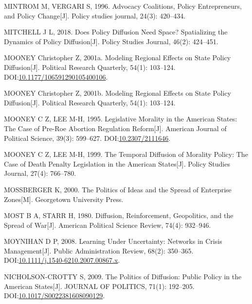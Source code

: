\documentclass[
  12pt,
]{ctexart}
\newlength{\cslhangindent}
\newlength{\cslentryspacingunit} %
\newenvironment{CSLReferences}[2] %
 {%
  \setlength{\parindent}{0pt}
  \ifodd #1
  \let\oldpar\par
  \def\par{\hangindent=\cslhangindent\oldpar}
  \fi
  \setlength{\parskip}{#2\cslentryspacingunit}
 }%
 {}
\begin{document}
\begin{CSLReferences}{1}{0}
\leavevmode{}%
MINTROM M, VERGARI S, 1996. Advocacy Coalitions, Policy Entrepreneurs, and Policy Change{[}J{]}. Policy studies journal, 24(3): 420--434.

\leavevmode{}%
MITCHELL J L, 2018. Does Policy Diffusion Need Space? {Spatializing} the Dynamics of Policy Diffusion{[}J{]}. Policy Studies Journal, 46(2): 424--451.

\leavevmode{}%
MOONEY Christopher Z, 2001a. Modeling {Regional Effects} on {State Policy Diffusion}{[}J{]}. Political Research Quarterly, 54(1): 103--124. DOI:\href{https://doi.org/10.1177/106591290105400106}{10.1177/106591290105400106}.

\leavevmode{}%
MOONEY Christopher Z, 2001b. Modeling Regional Effects on State Policy Diffusion{[}J{]}. Political Research Quarterly, 54(1): 103--124.

\leavevmode{}%
MOONEY C Z, LEE M-H, 1995. Legislative {Morality} in the {American States}: {The Case} of {Pre-Roe Abortion Regulation Reform}{[}J{]}. American Journal of Political Science, 39(3): 599--627. DOI:\href{https://doi.org/10.2307/2111646}{10.2307/2111646}.

\leavevmode{}%
MOONEY C Z, LEE M-H, 1999. The Temporal Diffusion of Morality Policy: {The} Case of Death Penalty Legislation in the {American} States{[}J{]}. Policy Studies Journal, 27(4): 766--780.

\leavevmode{}%
MOSSBERGER K, 2000. The {Politics} of {Ideas} and the {Spread} of {Enterprise Zones}{[}M{]}. {Georgetown University Press}.

\leavevmode{}%
MOST B A, STARR H, 1980. Diffusion, Reinforcement, Geopolitics, and the Spread of War{[}J{]}. American Political Science Review, 74(4): 932--946.

\leavevmode{}%
MOYNIHAN D P, 2008. Learning Under {Uncertainty}: {Networks} in {Crisis Management}{[}J{]}. Public Administration Review, 68(2): 350--365. DOI:\href{https://doi.org/10.1111/j.1540-6210.2007.00867.x}{10.1111/j.1540-6210.2007.00867.x}.

\leavevmode{}%
NICHOLSON-CROTTY S, 2009. The {Politics} of {Diffusion}: {Public Policy} in the {American States}{[}J{]}. JOURNAL OF POLITICS, 71(1): 192--205. DOI:\href{https://doi.org/10.1017/S0022381608090129}{10.1017/S0022381608090129}.


\end{CSLReferences}
\end{document}
